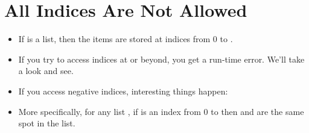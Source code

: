 \documentclass[letterpaper,10pt,english]{sphinxmanual}
\begin{document}
\section{All Indices Are Not Allowed}
\label{\detokenize{lecture_notes/lec08_lists1:all-indices-are-not-allowed}}\begin{itemize}
\item {} 
If  is a list, then the items are stored at indices from 0 to
.

\item {} 
If you try to access indices at  or beyond, you get a
run-time error. We’ll take a look and see.

\item {} 
If you access negative indices, interesting things happen:

\begin{sphinxVerbatim}[commandchars=\\\{\}]
\PYG{p}{[}\PYG{p}{]}
\end{sphinxVerbatim}

\item {} 
More specifically, for any list , if  is an index from 0 to
 then  and  are the same spot in
the list.

\end{itemize}
\end{document}
